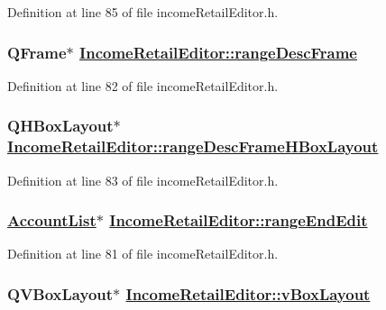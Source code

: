 Definition at line 85 of file income\-Retail\-Editor.h.\hypertarget{classIncomeRetailEditor_r25}{
\subsubsection[rangeDescFrame]{\setlength{\rightskip}{0pt plus 5cm}QFrame$\ast$ \hyperlink{classIncomeRetailEditor_r25}{Income\-Retail\-Editor::range\-Desc\-Frame}}}
\label{classIncomeRetailEditor_r25}


Definition at line 82 of file income\-Retail\-Editor.h.\hypertarget{classIncomeRetailEditor_r26}{
\subsubsection[rangeDescFrameHBoxLayout]{\setlength{\rightskip}{0pt plus 5cm}QHBox\-Layout$\ast$ \hyperlink{classIncomeRetailEditor_r26}{Income\-Retail\-Editor::range\-Desc\-Frame\-HBox\-Layout}}}
\label{classIncomeRetailEditor_r26}


Definition at line 83 of file income\-Retail\-Editor.h.\hypertarget{classIncomeRetailEditor_r24}{
\subsubsection[rangeEndEdit]{\setlength{\rightskip}{0pt plus 5cm}\hyperlink{classAccountList}{Account\-List}$\ast$ \hyperlink{classIncomeRetailEditor_r24}{Income\-Retail\-Editor::range\-End\-Edit}}}
\label{classIncomeRetailEditor_r24}


Definition at line 81 of file income\-Retail\-Editor.h.\hypertarget{classIncomeRetailEditor_r8}{
\subsubsection[vBoxLayout]{\setlength{\rightskip}{0pt plus 5cm}QVBox\-Layout$\ast$ \hyperlink{classIncomeRetailEditor_r3}{Income\-Retail\-Editor::v\-Box\-Layout}}}
\label{classIncomeRetailEditor_r8}


